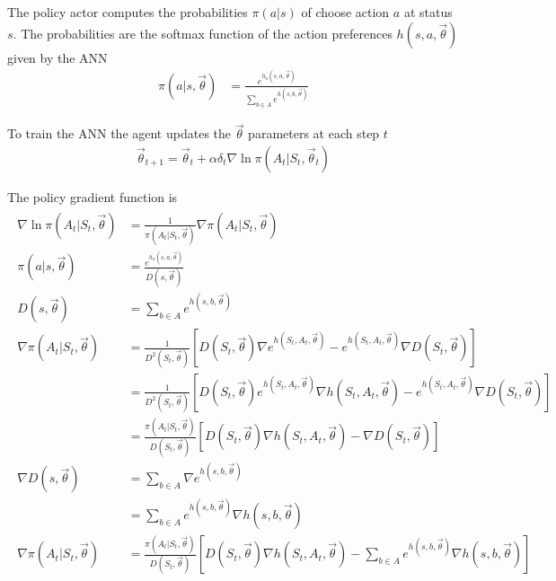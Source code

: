 \documentclass[]{article}
\begin{document}
The policy actor computes the probabilities $ \pi(a|s) $ of choose action $ a $ at status $ s $.
The probabilities are the softmax function of the action preferences $ h(s,a,\vec \theta) $ given by the ANN 
\begin{align}
	\pi(a|s, \vec \theta)
	&= \frac{e^{h_a(s,a,\vec{\theta})}}{\sum_{b \in A} e^{h(s,b,\vec{\theta})}}
\end{align}

To train the ANN the agent updates the $ \vec \theta $ parameters at each step $ t $
\begin{align}
	\vec \theta_{t+1} =
	\vec \theta_t + \alpha \delta_t \nabla \ln \pi(A_t|S_t, \vec \theta_t) 
\end{align}

The policy gradient function is
\begin{align*}
\begin{split}
	\nabla \ln \pi(A_t|S_t, \vec \theta)
	& = \frac{1}{\pi(A_t|S_t, \vec \theta)}
	\nabla \pi(A_t|S_t, \vec \theta)
	\\
	\pi(a|s, \vec \theta)
	&= \frac{e^{h_a(s,a,\vec{\theta})}}{D(s,\vec \theta)}
	\\
	D(s,\vec \theta)
	&= \sum_{b \in A} e^{h(s,b,\vec{\theta})}
	\\
	\nabla \pi(A_t|S_t, \vec \theta)
	& =
	\frac{1}{D^2(S_t,\vec \theta)}
	\left[
		D(S_t, \vec \theta) \nabla e^{h(S_t,A_t,\vec \theta)} - e^{h(S_t,A_t,\vec \theta)} \nabla D(S_t, \vec \theta)
	\right] 
	\\
	& =	\frac{1}{D^2(S_t,\vec \theta)}
	\left[
		D(S_t, \vec \theta) e^{h(S_t,A_t,\vec \theta)} \nabla h(S_t,A_t,\vec \theta)
		- e^{h(S_t,A_t,\vec \theta)} \nabla D(S_t, \vec \theta)
	\right] 
	\\
	& =
	\frac{\pi(A_t|S_t,\vec \theta)}{D(S_t,\vec \theta)}
	\left[
		D(S_t, \vec \theta) \nabla h(S_t,A_t,\vec \theta)
		- \nabla D(S_t, \vec \theta)
	\right] 
	\\
	\nabla D(s,\vec \theta)
	&= \sum_{b \in A} \nabla e^{h(s,b,\vec \theta)}
	\\
	&= \sum_{b \in A} e^{h(s,b,\vec \theta)}	\nabla h(s,b,\vec \theta)
	\\
	\nabla \pi(A_t|S_t, \vec \theta)
	& =
	\frac{\pi(A_t|S_t,\vec \theta)}{D(S_t,\vec \theta)}
	\left[
		D(S_t, \vec \theta) \nabla h(S_t,A_t,\vec \theta)
		- \sum_{b \in A} e^{h(s,b,\vec \theta)}	\nabla h(s,b,\vec \theta)
	\right] 
\end{split}
\end{align*}
\end{document}
